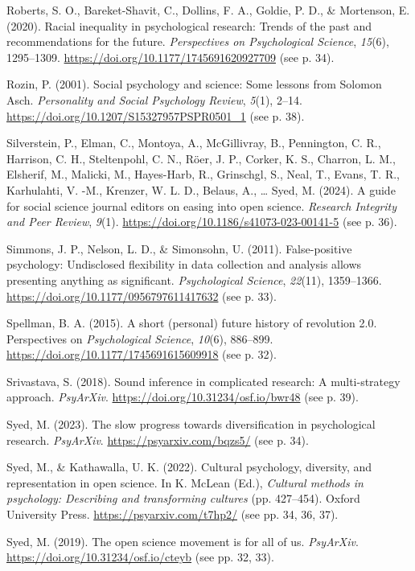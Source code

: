\documentclass[authordate, empirical,issue]{jote-new-article}
\begin{document}
Roberts, S. O., Bareket-Shavit, C., Dollins, F. A., Goldie, P. D., \& Mortenson, E. (2020). Racial inequality in psychological research: Trends of the past and recommendations for the future. \emph{Perspectives on Psychological Science}, \emph{15}(6), 1295–1309. \url{https://doi.org/10.1177/1745691620927709} (see p. 34).

Rozin, P. (2001). Social psychology and science: Some lessons from Solomon Asch. \emph{Personality and Social Psychology Review}, \emph{5}(1), 2–14. \url{https://doi.org/10.1207/S15327957PSPR0501\_1} (see p. 38).

Silverstein, P., Elman, C., Montoya, A., McGillivray, B., Pennington, C. R., Harrison, C. H., Steltenpohl, C. N., Röer, J. P., Corker, K. S., Charron, L. M., Elsherif, M., Malicki, M., Hayes-Harb, R., Grinschgl, S., Neal, T., Evans, T. R., Karhulahti, V. -M., Krenzer, W. L. D., Belaus, A., … Syed, M. (2024). A guide for social science journal editors on easing into open science. \emph{Research Integrity and Peer Review}, \emph{9}(1). \url{https://doi.org/10.1186/s41073-023-00141-5} (see p. 36).

Simmons, J. P., Nelson, L. D., \& Simonsohn, U. (2011). False-positive psychology: Undisclosed flexibility in data collection and analysis allows presenting anything as significant. \emph{Psychological Science}, \emph{22}(11), 1359–1366. \url{https://doi.org/10.1177/0956797611417632} (see p. 33).

Spellman, B. A. (2015). A short (personal) future history of revolution 2.0. Perspectives on \emph{Psychological Science}, \emph{10}(6), 886–899. \url{https://doi.org/10.1177/1745691615609918} (see p. 32).

Srivastava, S. (2018). Sound inference in complicated research: A multi-strategy approach. \emph{PsyArXiv}. \url{https://doi.org/10.31234/osf.io/bwr48} (see p. 39).

Syed, M. (2023). The slow progress towards diversification in psychological research. \emph{PsyArXiv}. \url{https://psyarxiv.com/bqzs5/} (see p. 34).

Syed, M., \& Kathawalla, U. K. (2022). Cultural psychology, diversity, and representation in open science. In K. McLean (Ed.), \emph{Cultural methods in psychology: Describing and transforming cultures} (pp. 427–454). Oxford University Press. \url{https://psyarxiv.com/t7hp2/} (see pp. 34, 36, 37).

Syed, M. (2019). The open science movement is for all of us. \emph{PsyArXiv}. \url{https://doi.org/10.31234/osf.io/cteyb} (see pp. 32, 33).
\end{document}
